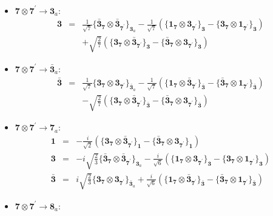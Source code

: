 \documentclass[english]{article}
\newcommand{\subcg}[3]{\big\{ {#1}\otimes{#2}\big\}^{}_{#3}}
\newcommand{\rep}[1]{\mathbf{#1}}
\begin{document}
\begin{itemize}
\begin{eqnarray*}
\end{eqnarray*}
\item $\rep{7}\otimes\rep{7^{\prime}}\to\rep{3}_{a}$:
\begin{eqnarray*}
\rep{3} &=& \frac{1}{\sqrt{7}}\subcg{\rep{\bar{3}}_{\rep{7}}}{\rep{\bar{3}}_{\rep{7^{\prime}}}}{\rep{3}_{a}}-\frac{1}{\sqrt{7}}\left(\subcg{\rep{1}_{\rep{7}}}{\rep{3}_{\rep{7^{\prime}}}}{\rep{3}}-\subcg{\rep{3}_{\rep{7}}}{\rep{1}_{\rep{7^{\prime}}}}{\rep{3}}\right) \\ 
 & & +\sqrt{\frac{2}{7}}\left(\subcg{\rep{3}_{\rep{7}}}{\rep{\bar{3}}_{\rep{7^{\prime}}}}{\rep{3}}-\subcg{\rep{\bar{3}}_{\rep{7}}}{\rep{3}_{\rep{7^{\prime}}}}{\rep{3}}\right)
\end{eqnarray*}
\item $\rep{7}\otimes\rep{7^{\prime}}\to\rep{\bar{3}}_{a}$:
\begin{eqnarray*}
\rep{\bar{3}} &=& \frac{1}{\sqrt{7}}\subcg{\rep{3}_{\rep{7}}}{\rep{3}_{\rep{7^{\prime}}}}{\rep{\bar{3}}_{a}}-\frac{1}{\sqrt{7}}\left(\subcg{\rep{1}_{\rep{7}}}{\rep{\bar{3}}_{\rep{7^{\prime}}}}{\rep{\bar{3}}}-\subcg{\rep{\bar{3}}_{\rep{7}}}{\rep{1}_{\rep{7^{\prime}}}}{\rep{\bar{3}}}\right) \\ 
 & & -\sqrt{\frac{2}{7}}\left(\subcg{\rep{3}_{\rep{7}}}{\rep{\bar{3}}_{\rep{7^{\prime}}}}{\rep{\bar{3}}}-\subcg{\rep{\bar{3}}_{\rep{7}}}{\rep{3}_{\rep{7^{\prime}}}}{\rep{\bar{3}}}\right)
\end{eqnarray*}
\item $\rep{7}\otimes\rep{7^{\prime}}\to\rep{7}_{a}$:
\begin{eqnarray*}
\rep{1} &=& -\frac{i}{\sqrt{2}}\left(\subcg{\rep{3}_{\rep{7}}}{\rep{\bar{3}}_{\rep{7^{\prime}}}}{\rep{1}}-\subcg{\rep{\bar{3}}_{\rep{7}}}{\rep{3}_{\rep{7^{\prime}}}}{\rep{1}}\right)
\\
\rep{3} &=& -i \sqrt{\frac{2}{3}}\subcg{\rep{\bar{3}}_{\rep{7}}}{\rep{\bar{3}}_{\rep{7^{\prime}}}}{\rep{3}_{a}}-\frac{i}{\sqrt{6}}\left(\subcg{\rep{1}_{\rep{7}}}{\rep{3}_{\rep{7^{\prime}}}}{\rep{3}}-\subcg{\rep{3}_{\rep{7}}}{\rep{1}_{\rep{7^{\prime}}}}{\rep{3}}\right)
\\
\rep{\bar{3}} &=& i \sqrt{\frac{2}{3}}\subcg{\rep{3}_{\rep{7}}}{\rep{3}_{\rep{7^{\prime}}}}{\rep{\bar{3}}_{a}}+\frac{i}{\sqrt{6}}\left(\subcg{\rep{1}_{\rep{7}}}{\rep{\bar{3}}_{\rep{7^{\prime}}}}{\rep{\bar{3}}}-\subcg{\rep{\bar{3}}_{\rep{7}}}{\rep{1}_{\rep{7^{\prime}}}}{\rep{\bar{3}}}\right)
\end{eqnarray*}
\item $\rep{7}\otimes\rep{7^{\prime}}\to\rep{8}_{a}$:

\end{itemize}
\end{document}
